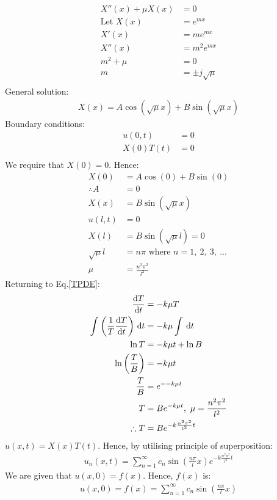 \documentclass[11pt]{article}
\numberwithin{equation}{section}
\begin{document}
\begin{align}
	X''(x) + \mu X(x) &= 0\\
	\textrm{Let } X(x) &= e^{mx}\\
	X'(x) &= me^{mx}\\
	X''(x) &= m^2e^{mx}\\
	m^2 + \mu &= 0\\
	m &= \pm j\sqrt{\mu}\\
\end{align}
General solution:
\begin{align}
	X(x) = A\cos\left(\sqrt{\mu}x\right) + B\sin\left(\sqrt{\mu}x\right)
\end{align}
Boundary conditions:
\begin{align}
	u\left(0,t\right) &= 0\\
	X(0)T(t) &= 0\\
\end{align}
We require that $X(0) = 0$. Hence:
\begin{align}
	X(0) &= A\cos\left(0\right) + B\sin\left(0\right)\\
	\therefore A &= 0\\
	X(x) &= B \sin\left(\sqrt{\mu}x\right)\\
	u\left(l,t\right) &= 0\\
	X(l) &= B\sin\left(\sqrt{\mu}l\right) = 0\\
	\sqrt{\mu}l &= n\pi \textrm{ where } n = 1, \ 2, \ 3, \ ... \\
	\mu &= \frac{n^2 \pi^2}{l^2}
\end{align}
Returning to Eq.\ref{TPDE}:
\begin{align}
	\frac{\dif T}{\dif t} &= -k\mu T\\
	\int_{}^{} \left(\frac{1}{T}\frac{\dif T}{\dif t}\right) \,\dif t &= -k\mu \int_{}^{}  \,\dif t\\
	\ln T &= -k \mu t + \ln B\\
	\ln \left(\frac{T}{B}\right) &= - k\mu t\\
	\frac{T}{B} &= e^{--k\mu t}\\
	T &= Be^{-k\mu t}, \ \mu = \frac{n^2 \pi^2}{l^2} \\
	\therefore T &= Be^{-k \frac{n^2 \pi^2}{l^2}t} 
\end{align}
$u(x,t) = X(x)T(t)$. Hence, by utilising principle of superposition:
\begin{align}
	u_n(x,t) = \sum_{n=1}^{\infty} c_n \sin\left(\frac{n\pi}{l}x\right)e^{-k \frac{n^2 \pi^2}{l^2}t}
\end{align}
We are given that $u(x, 0) = f(x)$. Hence, $f(x)$ is:
\begin{align}
	u(x,0) = f(x) = \sum_{n=1}^{\infty} c_n \sin\left(\frac{n\pi}{l}x\right)
\end{align}
\end{document}
